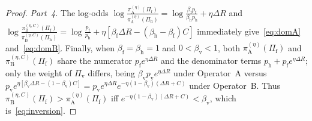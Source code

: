 \documentclass[11pt,a4paper]{article}
\begin{document}
\begin{proof}
\emph{Part~4.} The log-odds $\log\frac{\pi_{\mathrm{A}}^{(\eta)}(\Pi_{\mathrm{f}})}{\pi_{\mathrm{A}}^{(\eta)}(\Pi_{\mathrm{h}})} = \log\frac{\beta_{\mathrm{f}} p_{\mathrm{f}}}{\beta_{\mathrm{h}} p_{\mathrm{h}}} + \eta\Delta R$ and $\log\frac{\pi_{\mathrm{B}}^{(\eta, C)}(\Pi_{\mathrm{f}})}{\pi_{\mathrm{B}}^{(\eta, C)}(\Pi_{\mathrm{h}})} = \log\frac{p_{\mathrm{f}}}{p_{\mathrm{h}}} + \eta[\beta_{\mathrm{f}}\Delta R - (\beta_{\mathrm{h}} - \beta_{\mathrm{f}})C]$ immediately give~\eqref{eq:domA} and~\eqref{eq:domB}. Finally, when $\beta_{\mathrm{f}} = \beta_{\mathrm{h}} = 1$ and $0 < \beta_{\mathrm{v}} < 1$, both $\pi_{\mathrm{A}}^{(\eta)}(\Pi_{\mathrm{f}})$ and $\pi_{\mathrm{B}}^{(\eta, C)}(\Pi_{\mathrm{f}})$ share the numerator $p_{\mathrm{f}} e^{\eta \Delta R}$ and the denominator terms $p_{\mathrm{h}} + p_{\mathrm{f}} e^{\eta \Delta R}$; only the weight of $\Pi_{\mathrm{v}}$ differs, being $\beta_{\mathrm{v}} p_{\mathrm{v}} e^{\eta \Delta R}$ under Operator~A versus $p_{\mathrm{v}} e^{\eta[\beta_{\mathrm{v}}\Delta R - (1-\beta_{\mathrm{v}})C]} = p_{\mathrm{v}} e^{\eta \Delta R} e^{-\eta(1-\beta_{\mathrm{v}})(\Delta R + C)}$ under Operator~B. Thus $\pi_{\mathrm{B}}^{(\eta, C)}(\Pi_{\mathrm{f}}) > \pi_{\mathrm{A}}^{(\eta)}(\Pi_{\mathrm{f}})$ iff $e^{-\eta(1-\beta_{\mathrm{v}})(\Delta R + C)} < \beta_{\mathrm{v}}$, which is~\eqref{eq:inversion}.
\end{proof}
\end{document}
